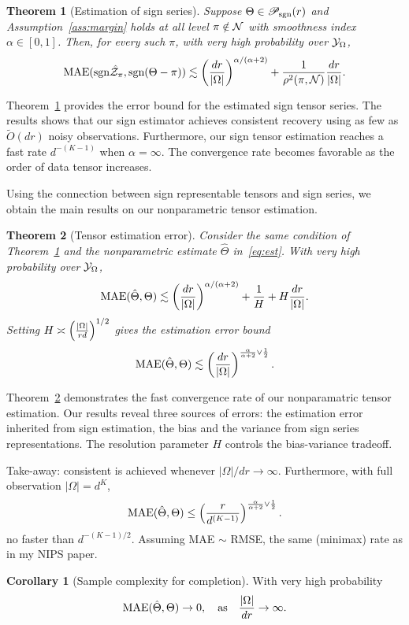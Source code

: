 \documentclass{article}
\theoremstyle{plain}
\newtheorem{thm}{Theorem}[section]
\theoremstyle{definition}
\newtheorem{cor}{Corollary}
\def\sign{\textup{sgn}}
\def\caliP{\mathscr{P}_{\textup{sgn}}}
\begin{document}
 \begin{thm}[Estimation of sign series]\label{thm:classification} Suppose $\Theta\in\caliP(r)$ and Assumption~\ref{ass:margin} holds at all level $\pi\notin \mathcal{N}$ with smoothness index $\alpha\in[0,1]$. Then, for every such $\pi$, with very high probability over $\mathcal{Y}_\Omega$, 
\[
\textup{MAE}(\sign \hat \tZ_\pi, \sign(\Theta-\pi)) \lesssim \left({d r \over |\Omega|}\right)^{\alpha/(\alpha+2)}+{1\over \rho^2(\pi, \tN)} {dr \over |\Omega|}.
\]
\end{thm}
Theorem~\ref{thm:classification} provides the error bound for the estimated sign tensor series. The results shows that our sign estimator achieves consistent recovery using as few as $\tilde O(dr)$ noisy observations. Furthermore, our sign tensor estimation reaches a fast rate $d^{-(K-1)}$ when $\alpha=\infty$. The convergence rate becomes favorable as the order of data tensor increases. 

Using the connection between sign representable tensors and sign series, we obtain the main results on our nonparametric tensor estimation. 
\begin{thm}[Tensor estimation error]\label{thm:estimation} Consider the same condition of Theorem~\ref{thm:classification} and the nonparametric estimate $\hat \Theta$ in~\eqref{eq:est}. With very high probability over $\mathcal{Y}_\Omega$,
\[
\textup{MAE}(\hat \Theta, \Theta)\lesssim \left({d r \over |\Omega|}\right)^{\alpha/(\alpha+2)}+{1\over H}+H{d r \over |\Omega|}.
\]
Setting $H\asymp \left( |\Omega|\over rd\right)^{1/2}$ gives the estimation error bound
\[
\textup{MAE}(\hat \Theta, \Theta)\lesssim \left(dr \over|\Omega|\right)^{{\alpha \over \alpha+2} \vee {1\over 2}}.
\]
\end{thm}
Theorem~\ref{thm:estimation} demonstrates the fast convergence rate of our nonparamatric tensor estimation. Our results reveal three sources of errors: the estimation error inherited from sign estimation, the bias and the variance from sign series representations. The resolution parameter $H$ controls the bias-variance tradeoff.


Take-away: consistent is achieved whenever $|\Omega|/dr\to\infty$. Furthermore, with full observation $|\Omega|=d^K$, 
\[
\textup{MAE}(\hat \Theta, \Theta)\leq \left(r\over d^{(K-1)}\right)^{{\alpha \over \alpha+2} \vee {1\over 2}}.
\]
no faster than $d^{-(K-1)/2}$. Assuming MAE $\sim$ RMSE, the same (minimax) rate as in my NIPS paper. 

\begin{cor}[Sample complexity for completion] With very high probability 
\[
\textup{MAE}(\hat \Theta, \Theta)\to 0, \quad \text{as}\quad {|\Omega|\over dr}\to \infty.
\]
\end{cor}
\end{document}
